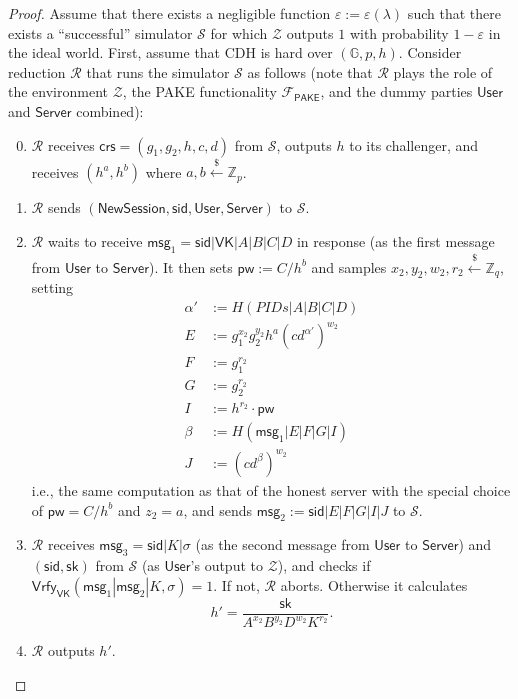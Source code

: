 \documentclass[10pt,a4paper]{article}
\newcommand{\simulator}{\mathcal{S}}
\newcommand{\env}{\mathcal{Z}}
\newcommand{\pake}{\mathcal{F}_{\mathsf{PAKE}}}
\newcommand{\user}{\mathsf{User}}
\newcommand{\sk}{\mathsf{sk}}
\newcommand{\pw}{\mathsf{pw}}
\newcommand{\newsession}{\mathsf{NewSession}}
\newcommand{\server}{\mathsf{Server}}
\newcommand{\msg}[1]{\mathsf{msg}_{#1}}
\newcommand{\rgets}{\xleftarrow{\$}}
\def\xjy#1{\textcolor{blue}{Jiayu: #1}}
\def\nam#1{\textcolor{red}{Naman: #1}}
\begin{document}
\begin{proof}
	Assume that there exists a negligible function $\varepsilon:=\varepsilon(\lambda)$ such that there exists a ``successful'' simulator $\simulator$ for which $\env$ outputs $1$ with probability $1-\varepsilon$ in the ideal world. First, assume that CDH is hard over $(\mathbb{G}, p, h)$. Consider reduction $\mathcal{R}$ that runs the simulator $\simulator$ as follows (note that $\mathcal{R}$ plays the role of the environment $\env$, the PAKE functionality $\pake$, and the dummy parties $\user$ and $\server$ combined):
	
	
	\begin{enumerate}\setcounter{enumi}{-1}
        \item $\mathcal{R}$ receives $\mathsf{crs}=(g_1, g_2, h, c, d)$ from $\simulator$, outputs $h$ to its challenger, and receives $(h^a, h^b)$ where $a,b\rgets\mathbb{Z}_p$. 
        
        
		\item $\mathcal{R}$ sends $(\newsession,\mathsf{sid}, \user, \server)$ to $\simulator$.
		\item $\mathcal{R}$ waits to receive $\msg{1} = \mathsf{sid}|\mathsf{VK}|A|B|C|D$ in response (as the first message from $\user$ to $\server$). It then sets $\pw:=C/h^b$ and samples $x_2,y_2,w_2,r_2\rgets\mathbb{Z}_q$, setting
		\begin{align*}
			\alpha'&:=H(PIDs|A|B|C|D)\\
			E &:= g_1^{x_2}g_2^{y_2}h^{a}(cd^{\alpha'})^{w_2}\\
			F &:= g_1^{r_2}\\
			G &:= g_2^{r_2}\\
			I &:= h^{r_2}\cdot\pw\\
			\beta &:= H(\msg{1}|E|F|G|I)\\
			J &:= (cd^{\beta})^{w_2}
		\end{align*}
		i.e., the same computation as that of the honest server with the special choice of $\pw = C/h^b$ and $z_2 = a$, and sends $\msg{2}:=\mathsf{sid}|E|F|G|I|J$ to $\simulator$.
		\item $\mathcal{R}$ receives $\msg{3}=\mathsf{sid}|K|\sigma$ (as the second message from $\user$ to $\server$) and $(\mathsf{sid},\sk)$ from $\simulator$ (as $\user$'s output to $\env$), and checks if $\mathsf{Vrfy}_\mathsf{VK}(\msg{1}|\msg{2}|K,\sigma)=1$. If not, $\mathcal{R}$ aborts. Otherwise it calculates 
		$$h'=\frac{\sk}{A^{x_2}B^{y_2}D^{w_2}K^{r_2}}.$$
		\item $\mathcal{R}$ outputs $h'$.		
	\end{enumerate}


\end{proof}
\end{document}
